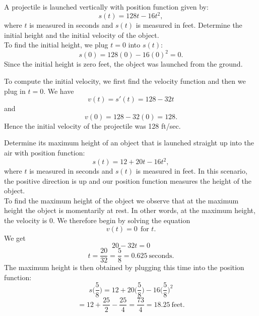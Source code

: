 \documentclass{ximera}
\begin{document}

\begin{example}[example 4]
A projectile is launched vertically with position function given by:
\[s(t) = 128t - 16t^2,\]
where $t$ is measured in seconds and $s(t)$ is measured in feet.
Determine the initial height and the initial velocity of the object.\\

To find the initial height, we plug $t = 0$ into $s(t)$:
\[s(0) = 128(0) - 16(0)^2 = 0.\]
Since the initial height is zero feet, the object was launched from the ground.

To compute the initial velocity, we first find the velocity function and then we plug in $t=0$.
We have
\[v(t) = s'(t) = 128 - 32t\]
and 
\[v(0) = 128 - 32(0) = 128.\]
Hence the initial velocity of the projectile was 128 ft/sec.

\end{example}




\begin{example}[example 5]
Determine its maximum height
of an object that is launched straight up into the air with position function:
\[s(t) = 12 + 20t - 16t^2,\]
where $t$ is measured in seconds and $s(t)$ is measured in feet. 
In this scenario, the positive direction is up and our position function measures the height of the object.\\
To find the maximum height of the object we observe that at the maximum height the object is momentarily at rest. 
In other words, at the maximum height, the velocity is 0. We therefore begin by solving the equation
\[v(t) = 0  \  \ \text{for $t$.}\]
 We get 
\[20-32t = 0\]
\[t = \frac{20}{32} = \frac{5}{8} = 0.625 \ \text{seconds}.\]
The maximum height is then obtained by plugging this time into the position function:
\[s\Big(\frac{5}{8}\Big) = 12 + 20\Big(\frac{5}{8}\Big) - 16\Big(\frac{5}{8}\Big)^2 \]
\[= 12 + \frac{25}{2} - \frac{25}{4} = \frac{73}{4} = 18.25\  \text{feet}. \]
\end{example}
\end{document}
